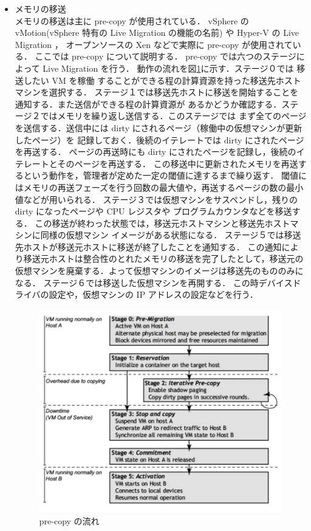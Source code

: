 \documentclass[graduation-thesis]{mlarticle}
\begin{document}
\begin{itemize}
\item メモリの移送\\
      メモリの移送は主に pre-copy が使用されている．\cite{precopy}
vSphere\cite{vsphere} の vMotion(vSphere 特有の Live Migration の機能の名前)\cite{vmotion} 
や Hyper-V\cite{hyper-v} の Live Migration \cite{hyper-v_live}，
オープンソースの Xen などで実際に pre-copy が使用されている．
ここでは pre-copy について説明する．
pre-copy では六つのステージによって Live Migration を行う．
動作の流れを図\ref{pre-copy}に示す．ステージ０では 移送したい VM を稼働
することができる程の計算資源を持った移送先ホストマシンを選択する．
ステージ１では移送先ホストに移送を開始することを通知する．また送信ができる程の計算資源が
あるかどうか確認する．ステージ２ではメモリを繰り返し送信する．このステージでは
まず全てのページを送信する．送信中には dirty にされるページ（稼働中の仮想マシンが更新したページ）を
記録しておく．後続のイテレートでは dirty にされたページを再送する．
ページの再送時にも dirty にされたページを記録し，後続のイテレートとそのページを再送する．
この移送中に更新されたメモリを再送するという動作を，管理者が定めた一定の閾値に達するまで繰り返す．
閾値にはメモリの再送フェーズを行う回数の最大値や，再送するページの数の最小値などが用いられる．
ステージ３では仮想マシンをサスペンドし，残りの dirty になったページや CPU レジスタや
プログラムカウンタなどを移送する．
この移送が終わった状態では，移送元ホストマシンと移送先ホストマシンに同様の仮想マシン
イメージがある状態になる．
ステージ５では移送先ホストが移送元ホストに移送が終了したことを通知する．
この通知により移送元ホストは整合性のとれたメモリの移送を完了したとして，移送元の
仮想マシンを廃棄する．よって仮想マシンのイメージは移送先のもののみになる．
ステージ６では移送した仮想マシンを再開する．
この時デバイスドライバの設定や，仮想マシンの IP アドレスの設定などを行う．
\begin{figure}[H]\begin{center}\includegraphics[width=16.0cm]{./img/pre-copy.png}\caption{ pre-copy の流れ}\label{pre-copy}\end{center}\end{figure}
\end{itemize}
\end{document}
